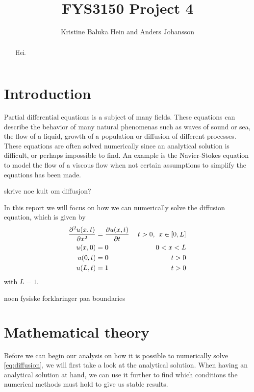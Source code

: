 \documentclass[12pt,english,a4paper]{article}
\title{FYS3150 Project 4}
\author{Kristine Baluka Hein and Anders Johansson}
\begin{document}

\pagestyle{fancy}
\tableofcontents

\begin{abstract}
Hei.
\end{abstract}
\clearpage

\section{Introduction}
Partial differential equations is a subject of many fields. These equations can describe the behavior of many natural phenomenas such as waves of sound or sea, the flow of a liquid, growth of a population or diffusion of different processes. \\
These equations are often solved numerically since an analytical solution is difficult, or perhaps impossible to find. An example is the Navier-Stokes equation to model the flow of a viscous flow when not certain assumptions to simplify the equations has been made. \\
\begin{center}
skrive noe kult om diffusjon?
\end{center}
In this report we will focus on how we can numerically solve the diffusion equation, which is given by
\begin{equation}\label{eq:diffusion}
\begin{aligned}
\pdv[2]{u(x,t)}{x} &= \pdv{u(x,t)}{t} &\: t>0, \:\:x\in[0,L] \\
u(x,0) &= 0  &0 < x < L\\
u(0,t) &= 0 &t>0 \\
u(L,t) &= 1&t>0
\end{aligned}
\end{equation}
with \(L = 1\).
\begin{center}
noen fysiske forklaringer paa boundaries
\end{center}

\section{Mathematical theory}
Before we can begin our analysis on how it is possible to numerically solve \vref{eq:diffusion}, we will first take a look at the analytical solution. When having an analytical solution at hand, we can use it further to find which conditions the numerical methods must hold to give us stable results.
\end{document}
